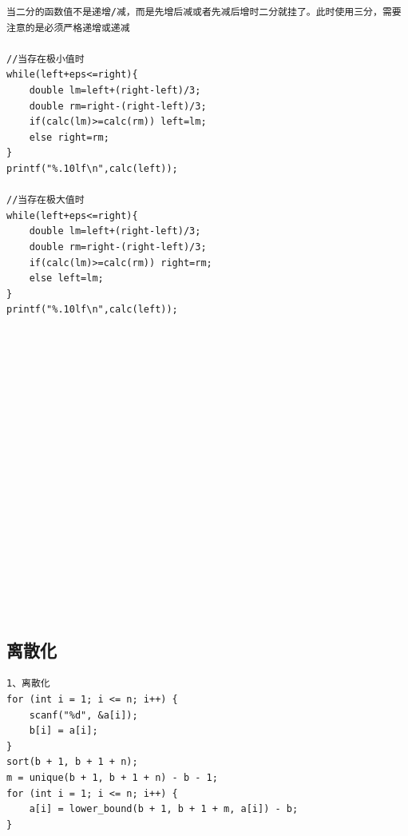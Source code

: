 \documentclass[twoside]{article}
\begin{document}
\begin{lstlisting}
当二分的函数值不是递增/减，而是先增后减或者先减后增时二分就挂了。此时使用三分，需要注意的是必须严格递增或递减

//当存在极小值时
while(left+eps<=right){
    double lm=left+(right-left)/3;
    double rm=right-(right-left)/3;
    if(calc(lm)>=calc(rm)) left=lm;
    else right=rm;
}
printf("%.10lf\n",calc(left));

//当存在极大值时
while(left+eps<=right){
    double lm=left+(right-left)/3;
    double rm=right-(right-left)/3;
    if(calc(lm)>=calc(rm)) right=rm;
    else left=lm;
}
printf("%.10lf\n",calc(left));




















\end{lstlisting}
\subsection{离散化}
\begin{lstlisting}
1、离散化
for (int i = 1; i <= n; i++) {
    scanf("%d", &a[i]);
    b[i] = a[i];
}
sort(b + 1, b + 1 + n);
m = unique(b + 1, b + 1 + n) - b - 1;
for (int i = 1; i <= n; i++) {
    a[i] = lower_bound(b + 1, b + 1 + m, a[i]) - b;
}
\end{lstlisting}
\end{document}
